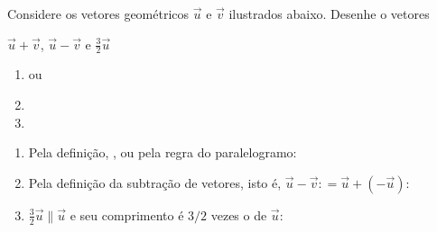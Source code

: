 \def\mypath{mathematics/2}

\newcommand\inlinebox[2][-0.5]{\raisebox{#1\height}{#2}}

\begin{question}
	\newcommand\mycoloneqq{\ensuremath{\mathrel{\mathop:}=}} %

	Considere os vetores geométricos $\vec u$ e $\vec v$ ilustrados abaixo.
	Desenhe o vetores
	\begin{inlineenum}
		\inlineitem $\vec u + \vec v$,
		\inlineitem $\vec u - \vec v$ e
		\inlineitem $\frac{3}{2}\vec u$
	\end{inlineenum}

	\begin{center}
		
	\end{center}

	\begin{answer}
		\begin{enumerate}
			\item \inlinebox{} ou \inlinebox{}

			\item \inlinebox{}

			\item \inlinebox{}
		\end{enumerate}
	\end{answer}

	\begin{solution}
		\begin{enumerate}
			\item
			Pela definição, \inlinebox{}, ou pela regra do paralelogramo: \inlinebox{}

			\item
			Pela definição da subtração de vetores, isto é, $\vec u - \vec v \mycoloneqq \vec u + (-\vec u)$:
			\inlinebox{}

			\item
			$\frac{3}{2}\vec u \parallel \vec u$ e seu comprimento é $3/2$ vezes o de $\vec u$:
			\inlinebox{}
		\end{enumerate}
	\end{solution}
\end{question}
